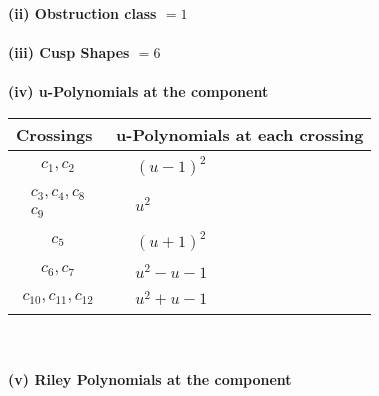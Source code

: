 \documentclass[1p]{elsarticle_modified}
\theoremstyle{definition}
\begin{document}
\flushleft \textbf{(ii) Obstruction class $= 1$}\\~\\
\flushleft \textbf{(iii) Cusp Shapes $= 6$}\\~\\
\newpage\renewcommand{\arraystretch}{1}
\flushleft \textbf{(iv) u-Polynomials at the component}\newline \\
\begin{tabular}{m{50pt}|m{274pt}}
Crossings & \hspace{64pt}u-Polynomials at each crossing \\
\hline $$\begin{aligned}c_{1},c_{2}\end{aligned}$$&$\begin{aligned}
&(u-1)^2
\end{aligned}$\\
\hline $$\begin{aligned}c_{3},c_{4},c_{8}\\c_{9}\end{aligned}$$&$\begin{aligned}
&u^2
\end{aligned}$\\
\hline $$\begin{aligned}c_{5}\end{aligned}$$&$\begin{aligned}
&(u+1)^2
\end{aligned}$\\
\hline $$\begin{aligned}c_{6},c_{7}\end{aligned}$$&$\begin{aligned}
&u^2- u-1
\end{aligned}$\\
\hline $$\begin{aligned}c_{10},c_{11},c_{12}\end{aligned}$$&$\begin{aligned}
&u^2+u-1
\end{aligned}$\\
\hline
\end{tabular}\\~\\
\newpage\renewcommand{\arraystretch}{1}
\flushleft \textbf{(v) Riley Polynomials at the component}\newline \\
\end{document}
